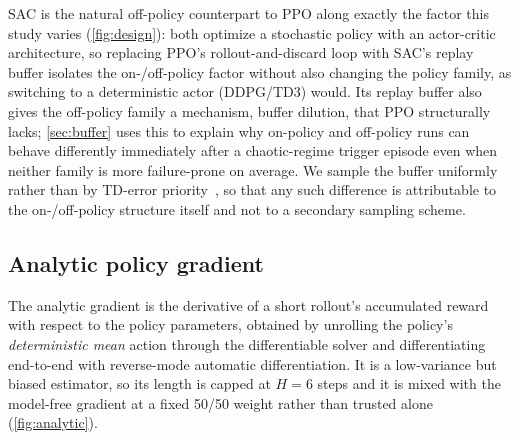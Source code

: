 SAC is the natural off-policy counterpart to PPO
along exactly the factor this study varies (\cref{fig:design}): both
optimize a stochastic policy with an actor-critic architecture, so replacing
PPO's rollout-and-discard loop with SAC's replay buffer isolates the
on-/off-policy factor without also changing the policy family, as switching
to a deterministic actor (DDPG/TD3) would. Its replay buffer also gives the
off-policy family a mechanism, buffer dilution, that PPO structurally lacks;
\cref{sec:buffer} uses this to explain why on-policy and off-policy runs can
behave differently immediately after a chaotic-regime trigger episode even
when neither family is more failure-prone on average. We sample the buffer
uniformly rather than by TD-error priority~\cite{schaul2016per}, so that any
such difference is attributable to the on-/off-policy structure itself and
not to a secondary sampling scheme.

\subsection{Analytic policy gradient}
\label{sec:analytic}

The analytic gradient is the derivative of a short rollout's accumulated
reward with respect to the policy parameters, obtained by unrolling the
policy's \emph{deterministic mean} action through the differentiable solver
and differentiating end-to-end with reverse-mode automatic differentiation.
It is a low-variance but biased estimator, so its length is capped at
$H=6$ steps and it is mixed with the model-free gradient at a fixed 50/50
weight rather than trusted alone (\cref{fig:analytic}).

